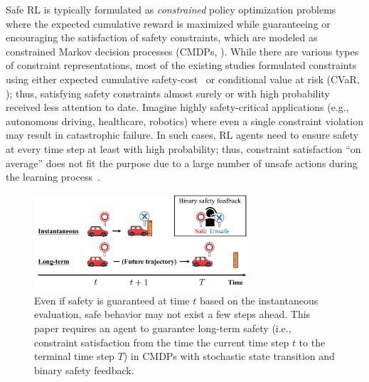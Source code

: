 \documentclass[letterpaper]{article} %
\begin{document}
Safe RL is typically formulated as \textit{constrained} policy optimization problems where the expected cumulative reward is maximized while guaranteeing or encouraging the satisfaction of safety constraints, which are modeled as constrained Markov decision processes (CMDPs, \citet{altman1999constrained}).
While there are various types of constraint representations, most of the existing studies formulated constraints using either expected cumulative safety-cost~\cite{altman1999constrained} or conditional value at risk (CVaR, \citet{rockafellar2000optimization}); thus, satisfying safety constraints almost surely or with high probability received less attention to date.
Imagine highly safety-critical applications (e.g., autonomous driving, healthcare, robotics) where even a single constraint violation may result in catastrophic failure.
In such cases, RL agents need to ensure safety at every time step at least with high probability; thus, constraint satisfaction “on average” does not fit the purpose due to a large number of unsafe actions during the learning process~\cite{stooke2020responsive}.

\begin{figure}[t]
    \centering
    \includegraphics[width=80mm]{figures/concept.pdf}
    \caption{Even if safety is guaranteed at time $t$ based on the instantaneous evaluation, safe behavior may not exist a few steps ahead. This paper requires an agent to guarantee long-term safety (i.e., constraint satisfaction from the time the current time step $t$ to the terminal time step $T$) in CMDPs with stochastic state transition and binary safety feedback.}
    \label{fig:concept}
\end{figure}
\end{document}
